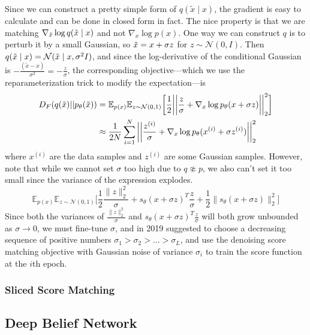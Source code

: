     Since we can construct a pretty simple form of $q(\tilde{x} \mid x)$, the gradient is easy to calculate and can be done in closed form in fact. The nice property is that we are matching $\nabla_{\Tilde{x}} \log q(\Tilde{x} \mid x)$ and not $\nabla_x \log p(x)$. One way we can construct $q$ is to perturb it by a small Gaussian, so $\Tilde{x} = x + \sigma z$ for $z \sim \mathcal{N}(0, I)$. Then $q(\Tilde{x} \mid x) = \mathcal{N}(\Tilde{x} \mid x, \sigma^2 I)$, and since the log-derivative of the conditional Gaussian is $-\frac{(\tilde{x} - x)}{\sigma^2} = -\frac{z}{\sigma}$, the corresponding objective---which we use the reparameterization trick to modify the expectation---is 
    \begin{align}
      D_F (q(\Tilde{x}) || p_\theta (\Tilde{x})) & = \mathbb{E}_{p(x)} \mathbb{E}_{z \sim \mathcal{N}(0, 1)} \bigg[ \frac{1}{2} \bigg| \bigg| \frac{z}{\sigma} + \nabla_x \log p_\theta (x + \sigma z) \bigg| \bigg|_2^2 \bigg] \\
                                                 & \approx \frac{1}{2N} \sum_{i=1}^N \bigg|\bigg| \frac{z^{(i)}}{\sigma} + \nabla_x \log p_\theta (x^{(i)} + \sigma z^{(i)}) \bigg|\bigg|_2^2
    \end{align}
    where $x^{(i)}$ are the data samples and $z^{(i)}$ are some Gaussian samples. However, note that while we cannot set $\sigma$ too high due to $q \not\approx p$, we also can't set it too small since the variance of the expression explodes. 
    \begin{equation}
      \mathbb{E}_{p(x)} \mathbb{E}_{z \sim \mathcal{N}(0, 1)} \bigg[ \frac{1}{2}\frac{\|z\|_2^2}{\sigma} + s_\theta(x + \sigma z)^T \frac{z}{\sigma} + \frac{1}{2}\big\|s_\theta(x + \sigma z)\big\|_2^2 \bigg]
    \end{equation}
    Since both the variances of $\frac{\|z\|_2^2}{\sigma}$ and $s_\theta(x + \sigma z)^T \frac{z}{\sigma}$ will both grow unbounded as $\sigma \rightarrow 0$, we must fine-tune $\sigma$, and \cite{score} in 2019 suggested to choose a decreasing sequence of positive numbers $\sigma_1 > \sigma_2 > \ldots > \sigma_L$, and use the denoising score matching objective with Gaussian noise of variance $\sigma_i$ to train the score function at the $i$th epoch. 

  \subsubsection{Sliced Score Matching}

\subsection{Deep Belief Network} 

